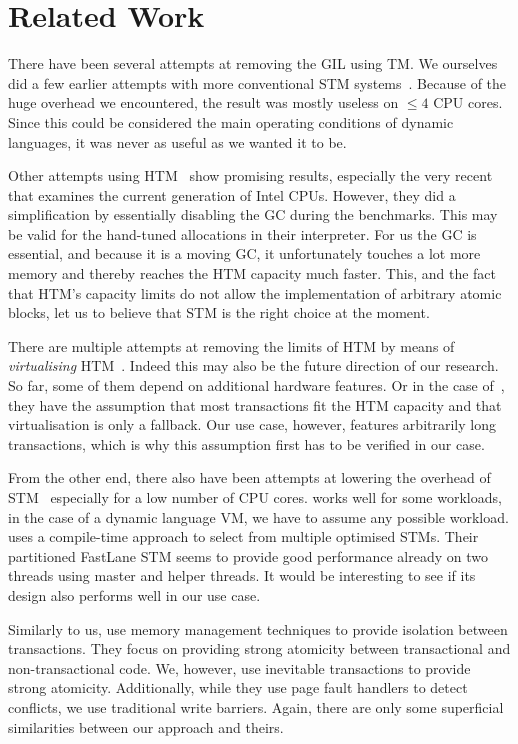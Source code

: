 \documentclass{sigplanconf}
\begin{document}
\section{Related Work}

There have been several attempts at removing the GIL using TM. We
ourselves did a few earlier attempts with more conventional STM
systems~\cite{stmupdate13}. Because of the huge overhead we
encountered, the result was mostly useless on $\le 4$ CPU cores.
Since this could be considered the main operating conditions of
dynamic languages, it was never as useful as we wanted it to be.

Other attempts using HTM~\cite{nicholas06,odaira14,fuad10} show
promising results, especially the very recent~\cite{odaira14} that
examines the current generation of Intel CPUs. However, they did a
simplification by essentially disabling the GC during the
benchmarks. This may be valid for the hand-tuned allocations in their
interpreter. For us the GC is essential, and because it is a moving
GC, it unfortunately touches a lot more memory and thereby reaches the
HTM capacity much faster.  This, and the fact that HTM's capacity
limits do not allow the implementation of arbitrary atomic blocks, let
us to believe that STM is the right choice at the moment.

There are multiple attempts at removing the limits of HTM by means of
\emph{virtualising} HTM~\cite{rajwar05,chung06}. Indeed this may also
be the future direction of our research. So far, some of them depend
on additional hardware features. Or in the case of~\cite{chung06},
they have the assumption that most transactions fit the HTM capacity
and that virtualisation is only a fallback. Our use case, however,
features arbitrarily long transactions, which is why this assumption
first has to be verified in our case.

From the other end, there also have been attempts at lowering the
overhead of STM~\cite{warmhoff13,spear09} especially for a low number
of CPU cores. \cite{spear09} works well for some workloads, in the
case of a dynamic language VM, we have to assume any possible
workload.  \cite{warmhoff13} uses a compile-time approach to select
from multiple optimised STMs. Their partitioned FastLane STM seems to
provide good performance already on two threads using master and
helper threads. It would be interesting to see if its design also
performs well in our use case.

Similarly to us, \cite{martin09} use memory management techniques to
provide isolation between transactions. They focus on providing strong
atomicity between transactional and non-transactional code.  We,
however, use inevitable transactions to provide strong atomicity.
Additionally, while they use page fault handlers to detect conflicts,
we use traditional write barriers. Again, there are only some
superficial similarities between our approach and theirs.
\end{document}
